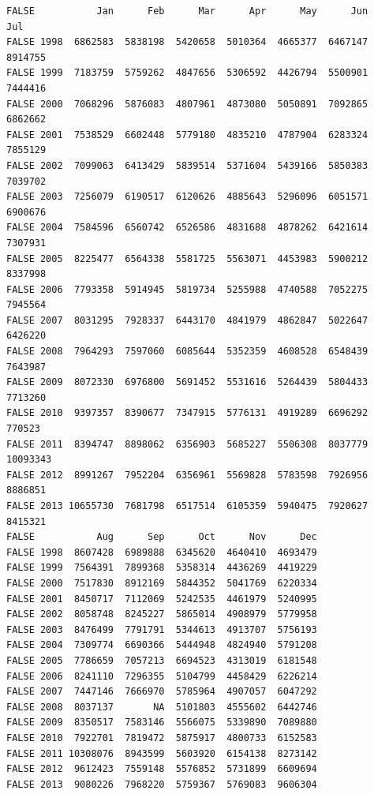 \documentclass[openany]{book}
\begin{document}
\begin{verbatim}
FALSE           Jan      Feb      Mar      Apr      May      Jun      Jul
FALSE 1998  6862583  5838198  5420658  5010364  4665377  6467147  8914755
FALSE 1999  7183759  5759262  4847656  5306592  4426794  5500901  7444416
FALSE 2000  7068296  5876083  4807961  4873080  5050891  7092865  6862662
FALSE 2001  7538529  6602448  5779180  4835210  4787904  6283324  7855129
FALSE 2002  7099063  6413429  5839514  5371604  5439166  5850383  7039702
FALSE 2003  7256079  6190517  6120626  4885643  5296096  6051571  6900676
FALSE 2004  7584596  6560742  6526586  4831688  4878262  6421614  7307931
FALSE 2005  8225477  6564338  5581725  5563071  4453983  5900212  8337998
FALSE 2006  7793358  5914945  5819734  5255988  4740588  7052275  7945564
FALSE 2007  8031295  7928337  6443170  4841979  4862847  5022647  6426220
FALSE 2008  7964293  7597060  6085644  5352359  4608528  6548439  7643987
FALSE 2009  8072330  6976800  5691452  5531616  5264439  5804433  7713260
FALSE 2010  9397357  8390677  7347915  5776131  4919289  6696292   770523
FALSE 2011  8394747  8898062  6356903  5685227  5506308  8037779 10093343
FALSE 2012  8991267  7952204  6356961  5569828  5783598  7926956  8886851
FALSE 2013 10655730  7681798  6517514  6105359  5940475  7920627  8415321
FALSE           Aug      Sep      Oct      Nov      Dec
FALSE 1998  8607428  6989888  6345620  4640410  4693479
FALSE 1999  7564391  7899368  5358314  4436269  4419229
FALSE 2000  7517830  8912169  5844352  5041769  6220334
FALSE 2001  8450717  7112069  5242535  4461979  5240995
FALSE 2002  8058748  8245227  5865014  4908979  5779958
FALSE 2003  8476499  7791791  5344613  4913707  5756193
FALSE 2004  7309774  6690366  5444948  4824940  5791208
FALSE 2005  7786659  7057213  6694523  4313019  6181548
FALSE 2006  8241110  7296355  5104799  4458429  6226214
FALSE 2007  7447146  7666970  5785964  4907057  6047292
FALSE 2008  8037137       NA  5101803  4555602  6442746
FALSE 2009  8350517  7583146  5566075  5339890  7089880
FALSE 2010  7922701  7819472  5875917  4800733  6152583
FALSE 2011 10308076  8943599  5603920  6154138  8273142
FALSE 2012  9612423  7559148  5576852  5731899  6609694
FALSE 2013  9080226  7968220  5759367  5769083  9606304
\end{verbatim}
\end{document}
